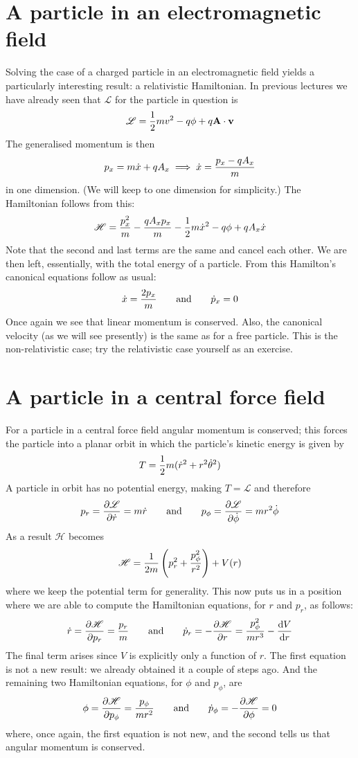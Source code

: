 \documentclass[english,seminar,headertitle]{lecture}
\newcommand{\lag}{\mathscr{L}}
\newcommand{\ham}{\mathscr{H}}
\begin{document}
\section{A particle in an electromagnetic field}

Solving the case of a charged particle in an electromagnetic field yields a particularly interesting result: a relativistic Hamiltonian. In previous lectures we have already seen that $\lag$ for the particle in question is
$$
\lag = {1\over 2}mv^2 - q\phi + q\mathbf{A}\cdot \mathbf{v}
$$
The generalised momentum is then
$$
p_x = m\dot{x} + qA_x \implies \dot{x} = {p_x - qA_x \over m}
$$
in one dimension. (We will keep to one dimension for simplicity.) The Hamiltonian follows from this:
$$
\ham = {p_x^2 \over m} - {qA_xp_x \over m} - {1\over 2}m\dot{x}^2 - q\phi + qA_x\dot{x}
$$
Note that the second and last terms are the same and cancel each other. We are then left, essentially, with the total energy of a particle. From this Hamilton's canonical equations follow as usual:
\begin{equation}
\dot{x} = {2p_x \over m} \qquad \textrm{and} \qquad \dot{p}_x = 0	\label{eq:charged-particle}
\end{equation}
Once again we see that linear momentum is conserved. Also, the canonical velocity (as we will see presently) is the same as for a free particle. This is the non-relativistic case; try the relativistic case yourself as an exercise.


\section{A particle in a central force field}

For a particle in a central force field angular momentum is conserved; this forces the particle into a planar orbit in which the particle's kinetic energy is given by
$$
T = {1\over 2} m (\dot{r}^2 + r^2\dot{\theta}^2)
$$
A particle in orbit has no potential energy, making $T = \lag$ and therefore
$$
p_r = {\partial \lag \over \partial \dot{r}} = m\dot{r} \qquad \textrm{and} \qquad p_\phi = {\partial \lag \over \partial \dot{\phi}} = mr^2\dot{\phi}
$$
As a result $\ham$ becomes
$$
\ham = {1\over 2m} \left( p_r^2 + {p_\phi^2 \over r^2} \right) + V(r)
$$
where we keep the potential term for generality. This now puts us in a position where we are able to compute the Hamiltonian equations, for $r$ and $p_r$, as follows:
$$
	\dot{r} = {\partial \ham \over \partial p_r} = {p_r \over m} \qquad \textrm{and} \qquad \dot{p}_r = - {\partial \ham \over \partial r} = {p_\phi^2 \over mr^3} - {\textrm{d}V \over \textrm{d}r}
$$
The final term arises since $V$ is explicitly only a function of $r$. The first equation is not a new result: we already obtained it a couple of steps ago. And the remaining two Hamiltonian equations, for $\phi$ and $p_\phi$, are
$$
\phi = {\partial\ham \over \partial p_\phi} = {p_\phi \over mr^2 } \qquad \textrm{and} \qquad \dot{p}_\phi = -{\partial\ham\over\partial\phi} = 0
$$
where, once again, the first equation is not new, and the second tells us that angular momentum is conserved.
\end{document}
